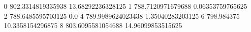 0 802.3314819335938 13.68292236328125
1 788.7120971679688 0.06353759765625
2 788.6485595703125 0.0
4 789.9989624023438 1.35040283203125
6 798.984375 10.3358154296875
8 803.6095581054688 14.96099853515625
